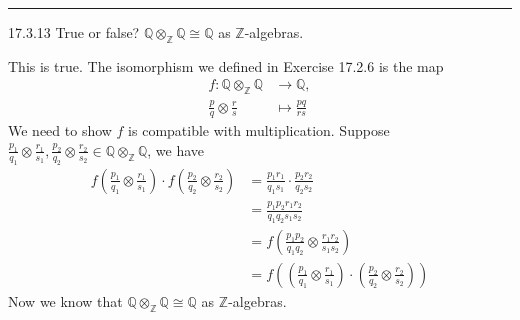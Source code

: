 \documentclass[a4paper, 12pt]{article}
\begin{document}
\noindent\rule{7in}{2.8pt}
\begin{problem}{17.3.13}
True or false? \(\mathbb{Q}\otimes_\mathbb{Z}\mathbb{Q}\cong \mathbb{Q}\) as \(\mathbb{Z}\)-algebras.
\end{problem}
\begin{solution}
This is true. The isomorphism we defined in Exercise 17.2.6 is the map 
\begin{align*}
	f:\mathbb{Q}\otimes_\mathbb{Z}\mathbb{Q}&\rightarrow \mathbb{Q},\\ 
	  \frac{p}{q}\otimes \frac{r}{s}&\mapsto \frac{pq}{rs}
\end{align*}
We need to show \(f\) is compatible with multiplication. Suppose \(\frac{p_1}{q_1}\otimes \frac{r_1}{s_1},\frac{p_2}{q_2}\otimes \frac{r_2}{s_2}\in \mathbb{Q}\otimes_\mathbb{Z}\mathbb{Q}\), we have 
\begin{align*}
f(\frac{p_1}{q_1}\otimes \frac{r_1}{s_1})\cdot f(\frac{p_2}{q_2}\otimes \frac{r_2}{s_2})&=\frac{p_1r_1}{q_1s_1}\cdot \frac{p_2r_2}{q_2s_2}\\ 
                                                                                        &=\frac{p_1p_2r_1r_2}{q_1q_2s_1s_2}\\ 
																						&=f(\frac{p_1p_2}{q_1q_2}\otimes \frac{r_1r_2}{s_1s_2})\\ 
																						&=f((\frac{p_1}{q_1}\otimes \frac{r_1}{s_1})\cdot (\frac{p_2}{q_2}\otimes \frac{r_2}{s_2}))
\end{align*}
Now we know that \(\mathbb{Q}\otimes_\mathbb{Z}\mathbb{Q}\cong \mathbb{Q}\) as \(\mathbb{Z}\)-algebras.
\end{solution}
\end{document}
